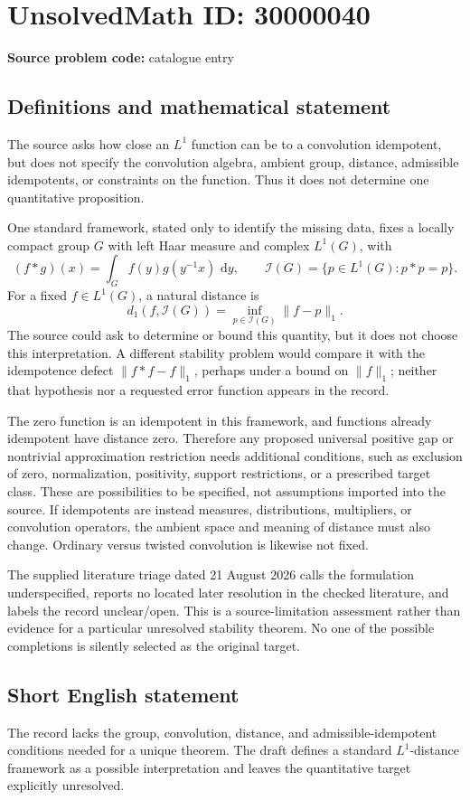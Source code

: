 \documentclass[11pt]{article}
\newcommand{\dd}{\,\mathrm{d}}
\begin{document}
\section*{UnsolvedMath ID: 30000040}
\textbf{Source problem code:} catalogue entry
\subsection{Definitions and mathematical statement}
The source asks how close an \(L^1\) function can be to a convolution idempotent, but does not specify the convolution algebra, ambient group, distance, admissible idempotents, or constraints on the function. Thus it does not determine one quantitative proposition.

One standard framework, stated only to identify the missing data, fixes a locally compact group \(G\) with left Haar measure and complex \(L^1(G)\), with
\[
 (f*g)(x)=\int_G f(y)g(y^{-1}x)\,\dd y,
 \qquad\mathcal I(G)=\{p\in L^1(G):p*p=p\}.
\]
For a fixed \(f\in L^1(G)\), a natural distance is
\[
 d_1(f,\mathcal I(G))=\inf_{p\in\mathcal I(G)}\|f-p\|_1.
\]
The source could ask to determine or bound this quantity, but it does not choose this interpretation. A different stability problem would compare it with the idempotence defect \(\|f*f-f\|_1\), perhaps under a bound on \(\|f\|_1\); neither that hypothesis nor a requested error function appears in the record.

The zero function is an idempotent in this framework, and functions already idempotent have distance zero. Therefore any proposed universal positive gap or nontrivial approximation restriction needs additional conditions, such as exclusion of zero, normalization, positivity, support restrictions, or a prescribed target class. These are possibilities to be specified, not assumptions imported into the source. If idempotents are instead measures, distributions, multipliers, or convolution operators, the ambient space and meaning of distance must also change. Ordinary versus twisted convolution is likewise not fixed.

The supplied literature triage dated 21 August 2026 calls the formulation underspecified, reports no located later resolution in the checked literature, and labels the record unclear/open. This is a source-limitation assessment rather than evidence for a particular unresolved stability theorem. No one of the possible completions is silently selected as the original target.
\subsection{Short English statement}
The record lacks the group, convolution, distance, and admissible-idempotent conditions needed for a unique theorem. The draft defines a standard \(L^1\)-distance framework as a possible interpretation and leaves the quantitative target explicitly unresolved.
\end{document}
